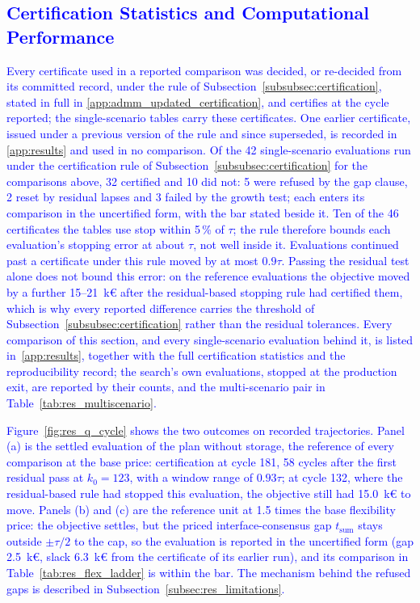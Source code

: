 \documentclass[preprint,12pt]{elsarticle}
\begin{document}
\subsection{\textcolor{blue}{Certification Statistics and Computational Performance}}
\label{subsec:res_certification}

\textcolor{blue}{
    Every certificate used in a reported comparison was decided, or re-decided from its committed record, under the rule of Subsection~\ref{subsubsec:certification}, stated in full in \ref{app:admm_updated_certification}, and certifies at the cycle reported; the single-scenario tables carry these certificates. One earlier certificate, issued under a previous version of the rule and since superseded, is recorded in \ref{app:results} and used in no comparison.
    Of the 42 single-scenario evaluations run under the certification rule of Subsection~\ref{subsubsec:certification} for the comparisons above, 32 certified and 10 did not: 5 were refused by the gap clause, 2 reset by residual lapses and 3 failed by the growth test; each enters its comparison in the uncertified form, with the bar stated beside it. Ten of the 46 certificates the tables use stop within 5\,\% of $\tau$; the rule therefore bounds each evaluation's stopping error at about $\tau$, not well inside it. Evaluations continued past a certificate under this rule moved by at most $0.9\tau$. Passing the residual test alone does not bound this error: on the reference evaluations the objective moved by a further 15--21~k\euro{} after the residual-based stopping rule had certified them, which is why every reported difference carries the threshold of Subsection~\ref{subsubsec:certification} rather than the residual tolerances. Every comparison of this section, and every single-scenario evaluation behind it, is listed in~\ref{app:results}, together with the full certification statistics and the reproducibility record; the search's own evaluations, stopped at the production exit, are reported by their counts, and the multi-scenario pair in Table~\ref{tab:res_multiscenario}.
}

\textcolor{blue}{
    Figure~\ref{fig:res_q_cycle} shows the two outcomes on recorded trajectories. Panel (a) is the settled evaluation of the plan without storage, the reference of every comparison at the base price: certification at cycle 181, 58 cycles after the first residual pass at $k_0 = 123$, with a window range of $0.93\tau$; at cycle 132, where the residual-based rule had stopped this evaluation, the objective still had 15.0~k\euro{} to move. Panels (b) and (c) are the reference unit at 1.5 times the base flexibility price: the objective settles, but the priced interface-consensus gap $t_{\text{sum}}$ stays outside $\pm\tau/2$ to the cap, so the evaluation is reported in the uncertified form (gap 2.5~k\euro, slack 6.3~k\euro{} from the certificate of its earlier run), and its comparison in Table~\ref{tab:res_flex_ladder} is within the bar. The mechanism behind the refused gaps is described in Subsection~\ref{subsec:res_limitations}.
}
\end{document}
